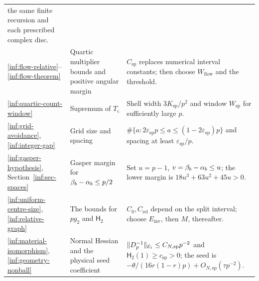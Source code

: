 \begin{lemma}
\begin{longtable}{@{}>{\raggedright\arraybackslash}p{}>{\raggedright\arraybackslash}p{}>{\raggedright\arraybackslash}p{}@{}}
the same finite recursion and each prescribed complex disc.\\
\ref{inf:flow-relative}--\ref{inf:flow-theorem} &
Quartic multiplier bounds and positive angular margin &
$C_{\mathrm{sp}}$ replaces numerical interval constants;
then choose $W_{\mathrm{flow}}$ and the threshold.\\
\ref{inf:quartic-count-window} & Supremum of $T_\varsigma$ &
Shell width $3K_{\mathrm{sp}}/p^2$ and window
$W_{\mathrm{sp}}$ for sufficiently large $p$.\\
\ref{inf:grid-avoidance}, \ref{inf:integer-gap} &
Grid size and spacing &
$\#\{a:2\varepsilon_{\mathrm{sp}}p\le a\le
(1-2\varepsilon_{\mathrm{sp}})p\}$ and spacing
at least $\varepsilon_{\mathrm{sp}}/p$.\\
\eqref{inf:gasper-hypothesis}, Section~\ref{inf:sec-spaces} &
Gasper margin for $\beta_b-\alpha_b\le p/2$ &
Set $u=p-1$, $v=\beta_b-\alpha_b\le u$; the lower margin is
$18u^3+63u^2+45u>0$.\\
\ref{inf:uniform-centre-size}, \ref{inf:relative-graph} &
The bounds for $pg_2$ and $\mathsf H_2$ &
$C_0,C_{\mathrm{rel}}$ depend on the split interval;
choose $E_{\mathrm{inv}}$, then $M$, thereafter.\\
\ref{inf:material-isomorphism}, \ref{inf:geometry-nonball} &
Normal Hessian and the physical seed coefficient &
$\lVert D_p^{-1}\rVert_{\mathcal E_1}\le C_{N,\mathrm{sp}}p^{-2}$ and
$\mathsf H_2(1)\ge c_{\mathrm{sp}}>0$;
the seed is $-\theta/(16r(1-r)p)+O_{N,\mathrm{sp}}(\tau p^{-2})$.\\
\bottomrule
\end{longtable}
\endgroup
\end{lemma}
